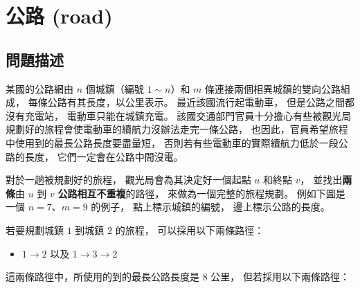 \section{公路 (road)}

\subsection{問題描述}

某國的公路網由 \(n\) 個城鎮（編號 \(1\sim n\)）和 \(m\)
條連接兩個相異城鎮的雙向公路組成， 每條公路有其長度，以公里表示。
最近該國流行起電動車， 但是公路之間都沒有充電站， 電動車只能在城鎮充電。
該國交通部門官員十分擔心有些被觀光局規劃好的旅程會使電動車的續航力沒辦法走完一條公路，
也因此，官員希望旅程中使用到的最長公路長度要盡量短，
否則若有些電動車的實際續航力低於一段公路的長度，
它們一定會在公路中間沒電。

對於一趟被規劃好的旅程， 觀光局會為其決定好一個起點 \(u\) 和終點 \(v\)，
並找出\textbf{兩條}由 \(u\) 到 \(v\) \textbf{公路相互不重複}的路徑，
來做為一個完整的旅程規劃。 例如下圖是一個 \(n=7\)、\(m=9\) 的例子，
點上標示城鎮的編號， 邊上標示公路的長度。

\begin{figure}[h]
\centering
{}
\end{figure}

若要規劃城鎮 \(1\) 到城鎮 \(2\) 的旅程， 可以採用以下兩條路徑：

\begin{itemize}
\tightlist
\item
  \(1\to 2\) 以及 \(1\to 3\to 2\)
\end{itemize}

這兩條路徑中，所使用的到的最長公路長度是 \(8\) 公里，
但若採用以下兩條路徑：

